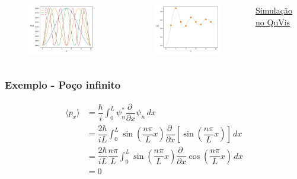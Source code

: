 \documentclass[12pt,brazil,table]{beamer}
\begin{document}
\begin{frame}
\begin{columns}[c]
      \column{5cm}
        \vspace*{-0.6cm}
        \begin{figure}
          \hspace{-1.25cm}\includegraphics[width=4.5cm]{figuras/fig17c}
        \end{figure}
        \vspace*{-0.75cm}
        \begin{figure}
          \hspace{-1.25cm}\includegraphics[width=4.5cm]{figuras/fig17b}
        \end{figure}
        \vspace*{-0.6cm}
        \href{https://www.st-andrews.ac.uk/physics/quvis/simulations_html5/sims/infwell1d/infwell1d.html}{\color{blue} Simulação no QuVis}
    \end{columns}
  
\end{frame}



\begin{frame}
  \frametitle{Exemplo - Poço infinito}  
  \fontsize{9pt}{11pt}\selectfont
  
    \begin{align*}
            \langle p_x \rangle & = \dfrac{\hbar}{i}\int_0^L \psi_n^* \dfrac{\partial\;}{\partial x} \psi_n\,dx\\
            &= \dfrac{2\hbar}{iL}\int_0^L \sin \left( \dfrac{n\pi}{L}x \right)\dfrac{\partial\;}{\partial x}\left[ \sin \left( \dfrac{n\pi}{L}x \right) \right]\,dx\\
            &= \dfrac{2\hbar}{iL}\dfrac{n\pi}{L}\int_0^L \sin \left( \dfrac{n\pi}{L}x \right)\dfrac{\partial\;}{\partial x}\cos \left( \dfrac{n\pi}{L}x \right)\,dx\\
            &= 0
          \end{align*}
  
\end{frame}
\end{document}
